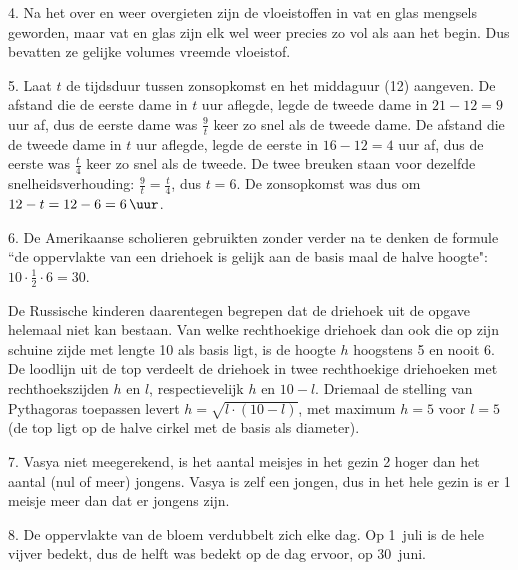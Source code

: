 \begin{problem}{4.}
    Na het over en weer overgieten zijn de vloeistoffen in vat en glas mengsels geworden, maar vat en glas zijn elk wel weer precies zo vol als aan het begin. Dus bevatten ze gelijke volumes vreemde vloeistof.
\end{problem}

\begin{problem}{5.}
    Laat $t$ de tijdsduur tussen zonsopkomst en het middaguur (\SI{12}{\uur}) aangeven. De afstand die de eerste dame in $t$ uur aflegde, legde de tweede dame in $21 - 12 = 9$ uur af, dus de eerste dame was $\frac{9}{t}$ keer zo snel als de tweede dame. De afstand die de tweede dame in $t$ uur aflegde, legde de eerste in $16 - 12 = 4$ uur af, dus de eerste was $\frac{t}{4}$ keer zo snel als de tweede. De twee breuken staan voor dezelfde snelheidsverhouding: $\frac{9}{t} = \frac{t}{4}$, dus $t = 6$. De zonsopkomst was dus om $12 - t = 12 - 6 = \SI{6}{\uur}$.
\end{problem}

\begin{problem}{6.}
    De Amerikaanse scholieren gebruikten zonder verder na te denken de formule ``de oppervlakte van een driehoek is gelijk aan de basis maal de halve hoogte": $10 \cdot \frac{1}{2} \cdot 6 = 30$.

    De Russische kinderen daarentegen begrepen dat de driehoek uit de opgave helemaal niet kan bestaan. Van welke rechthoekige driehoek dan ook die op zijn schuine zijde met lengte 10 als basis ligt, is de hoogte $h$ hoogstens 5 en nooit 6. De loodlijn uit de top verdeelt de driehoek in twee rechthoekige driehoeken met rechthoekszijden $h$ en $l$, respectievelijk $h$ en $10 - l$. Driemaal de stelling van Pythagoras toepassen levert $h = \sqrt{l \cdot (10 - l)}$, met maximum $h = 5$ voor $l = 5$ (de top ligt op de halve cirkel met de basis als diameter).
\end{problem}

\clearpage

\begin{problem}{7.}
    Vasya niet meegerekend, is het aantal meisjes in het gezin 2 hoger dan het aantal (nul of meer) jongens. Vasya is zelf een jongen, dus in het hele gezin is er 1 meisje meer dan dat er jongens zijn.
\end{problem}

\begin{problem}{8.}
    De oppervlakte van de bloem verdubbelt zich elke dag. Op 1~juli is de hele vijver bedekt, dus de helft was bedekt op de dag ervoor, op 30~juni.
\end{problem}

